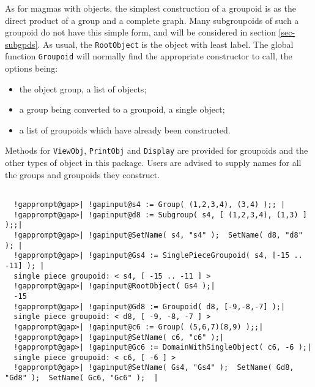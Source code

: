 \documentclass[a4paper,11pt]{report}
\begin{document}
{{{ As for magmas with objects, the simplest construction of a groupoid is as the
direct product of a group and a complete graph. Many subgroupoids of such a
groupoid do not have this simple form, and will be considered in section \ref{sec-subgpds}. As usual, the \texttt{RootObject} is the object with least label. The global function \texttt{Groupoid} will normally find the appropriate constructor to call, the options being: 
\begin{itemize}
\item  the object group, a list of objects; 
\item  a group being converted to a groupoid, a single object; 
\item  a list of groupoids which have already been constructed. 
\end{itemize}
 

 Methods for \texttt{ViewObj}, \texttt{PrintObj} and \texttt{Display} are provided for groupoids and the other types of object in this package.
Users are advised to supply names for all the groups and groupoids they
construct. 

 }

 
\begin{Verbatim}[commandchars=!@|,fontsize=\small,frame=single,label=Example]
  
  !gapprompt@gap>| !gapinput@s4 := Group( (1,2,3,4), (3,4) );; |
  !gapprompt@gap>| !gapinput@d8 := Subgroup( s4, [ (1,2,3,4), (1,3) ] );;|
  !gapprompt@gap>| !gapinput@SetName( s4, "s4" );  SetName( d8, "d8" ); |
  !gapprompt@gap>| !gapinput@Gs4 := SinglePieceGroupoid( s4, [-15 .. -11] ); |
  single piece groupoid: < s4, [ -15 .. -11 ] >
  !gapprompt@gap>| !gapinput@RootObject( Gs4 );|
  -15
  !gapprompt@gap>| !gapinput@Gd8 := Groupoid( d8, [-9,-8,-7] );|
  single piece groupoid: < d8, [ -9, -8, -7 ] >
  !gapprompt@gap>| !gapinput@c6 := Group( (5,6,7)(8,9) );;|
  !gapprompt@gap>| !gapinput@SetName( c6, "c6" );|
  !gapprompt@gap>| !gapinput@Gc6 := DomainWithSingleObject( c6, -6 );|
  single piece groupoid: < c6, [ -6 ] >
  !gapprompt@gap>| !gapinput@SetName( Gs4, "Gs4" );  SetName( Gd8, "Gd8" );  SetName( Gc6, "Gc6" );  |
  
\end{Verbatim}
 

}}
\end{document}
